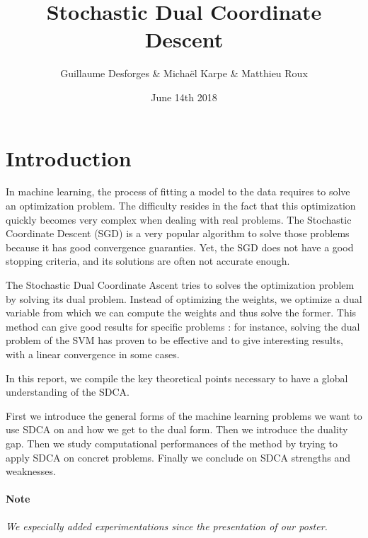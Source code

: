 \documentclass{article}
\title{Stochastic Dual Coordinate Descent}
\author{Guillaume Desforges \& Michaël Karpe \& Matthieu Roux}
\date{June 14th 2018}
\begin{document}
\maketitle

\section{Introduction}

\hspace{2em}
In machine learning, the process of fitting a model to the data requires to solve an optimization problem.
The difficulty resides in the fact that this optimization quickly becomes very complex when dealing with real problems.
The Stochastic Coordinate Descent (SGD) is a very popular algorithm to solve those problems because it has good convergence guaranties.
Yet, the SGD does not have a good stopping criteria, and its solutions are often not accurate enough.

\hspace{2em}
The Stochastic Dual Coordinate Ascent tries to solves the optimization problem by solving its dual problem.
Instead of optimizing the weights, we optimize a dual variable from which we can compute the weights and thus solve the former.
This method can give good results for specific problems : for instance, solving the dual problem of the SVM has proven to be effective and to give interesting results, with a linear convergence in some cases.

\hspace{2em}
In this report, we compile the key theoretical points necessary to have a global understanding of the SDCA.

\hspace{2em}
First we introduce the general forms of the machine learning problems we want to use SDCA on and how we get to the dual form.
Then we introduce the duality gap.
Then we study computational performances of the method by trying to apply SDCA on concret problems.
Finally we conclude on SDCA strengths and weaknesses.

\paragraph{Note} \textit{We especially added experimentations since the presentation of our poster.}
\end{document}
